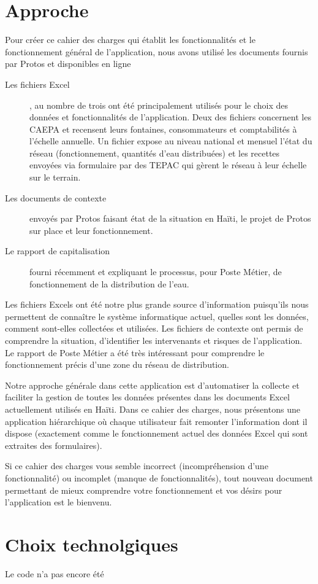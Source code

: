 \documentclass[a4paper, 11pt]{article}
\begin{document}
\section{Approche}
  Pour créer ce cahier des charges qui établit les fonctionnalités et le fonctionnement général de l'application, nous avons utilisé les documents fournis par Protos et disponibles en ligne
  \begin{description}
    \item[Les fichiers Excel], au nombre de trois ont été principalement utilisés pour le choix des données et fonctionnalités de l'application. Deux des fichiers concernent les CAEPA et recensent leurs fontaines, consommateurs et comptabilités à l'échelle annuelle. Un fichier expose au niveau national et mensuel l'état du réseau (fonctionnement, quantités d'eau distribuées) et les recettes envoyées via formulaire par des TEPAC qui gèrent le réseau à leur échelle sur le terrain.
    \item[Les documents de contexte] envoyés par Protos faisant état de la situation en Haïti, le projet de Protos sur place et leur fonctionnement.
    \item[Le rapport de capitalisation] fourni récemment et expliquant le processus, pour Poste Métier, de fonctionnement de la distribution de l'eau.
  \end{description}
  Les fichiers Excels ont été notre plus grande source d'information puisqu'ils nous permettent de connaître le système informatique actuel, quelles sont les données, comment sont-elles collectées et utilisées.
  Les fichiers de contexte ont permis de comprendre la situation, d'identifier les intervenants et risques de l'application.
  Le rapport de Poste Métier a été très intéressant pour comprendre le fonctionnement précis d'une zone du réseau de distribution.

  Notre approche générale dans cette application est d'automatiser la collecte et faciliter la gestion de toutes les données présentes dans les documents Excel actuellement utilisés en Haïti. Dans ce cahier des charges, nous présentons une application hiérarchique où chaque utilisateur fait remonter l'information dont il dispose (exactement comme le fonctionnement actuel des données Excel qui sont extraites des formulaires).

  \begin{shaded}
    Si ce cahier des charges vous semble incorrect (incompréhension d'une fonctionnalité) ou incomplet (manque de fonctionnalités), tout nouveau document permettant de mieux comprendre votre fonctionnement et vos désirs pour l'application est le bienvenu.
  \end{shaded}

\section{Choix technolgiques}
  Le code n'a pas encore été
\end{document}
